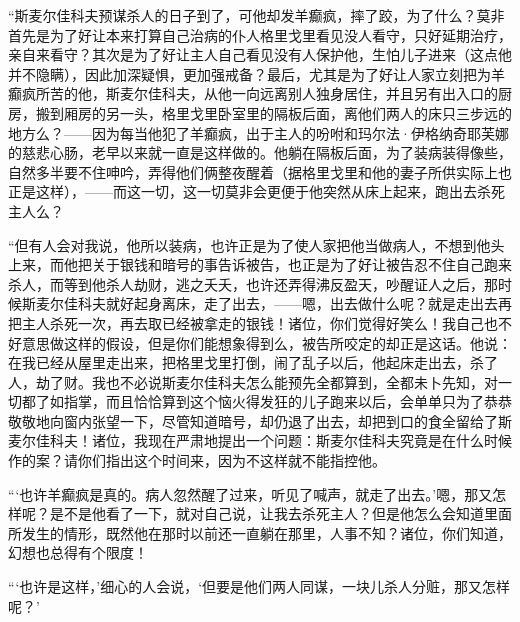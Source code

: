 \par “斯麦尔佳科夫预谋杀人的日子到了，可他却发羊癫疯，摔了跤，为了什么？莫非首先是为了好让本来打算自己治病的仆人格里戈里看见没人看守，只好延期治疗，亲自来看守？其次是为了好让主人自己看见没有人保护他，生怕儿子进来（这点他并不隐瞒），因此加深疑惧，更加强戒备？最后，尤其是为了好让人家立刻把为羊癫疯所苦的他，斯麦尔佳科夫，从他一向远离别人独身居住，并且另有出入口的厨房，搬到厢房的另一头，格里戈里卧室里的隔板后面，离他们两人的床只三步远的地方么？——因为每当他犯了羊癫疯，出于主人的吩咐和玛尔法·伊格纳奇耶芙娜的慈悲心肠，老早以来就一直是这样做的。他躺在隔板后面，为了装病装得像些，自然多半要不住呻吟，弄得他们俩整夜醒着（据格里戈里和他的妻子所供实际上也正是这样），——而这一切，这一切莫非会更便于他突然从床上起来，跑出去杀死主人么？
\par “但有人会对我说，他所以装病，也许正是为了使人家把他当做病人，不想到他头上来，而他把关于银钱和暗号的事告诉被告，也正是为了好让被告忍不住自己跑来杀人，而等到他杀人劫财，逃之夭夭，也许还弄得沸反盈天，吵醒证人之后，那时候斯麦尔佳科夫就好起身离床，走了出去，——嗯，出去做什么呢？就是走出去再把主人杀死一次，再去取已经被拿走的银钱！诸位，你们觉得好笑么！我自己也不好意思做这样的假设，但是你们能想象得到么，被告所咬定的却正是这话。他说：在我已经从屋里走出来，把格里戈里打倒，闹了乱子以后，他起床走出去，杀了人，劫了财。我也不必说斯麦尔佳科夫怎么能预先全都算到，全都未卜先知，对一切都了如指掌，而且恰恰算到这个恼火得发狂的儿子跑来以后，会单单只为了恭恭敬敬地向窗内张望一下，尽管知道暗号，却仍退了出去，却把到口的食全留给了斯麦尔佳科夫！诸位，我现在严肃地提出一个问题：斯麦尔佳科夫究竟是在什么时候作的案？请你们指出这个时间来，因为不这样就不能指控他。
\par “‘也许羊癫疯是真的。病人忽然醒了过来，听见了喊声，就走了出去。’嗯，那又怎样呢？是不是他看了一下，就对自己说，让我去杀死主人？但是他怎么会知道里面所发生的情形，既然他在那时以前还一直躺在那里，人事不知？诸位，你们知道，幻想也总得有个限度！
\par “‘也许是这样，’细心的人会说，‘但要是他们两人同谋，一块儿杀人分赃，那又怎样呢？’
